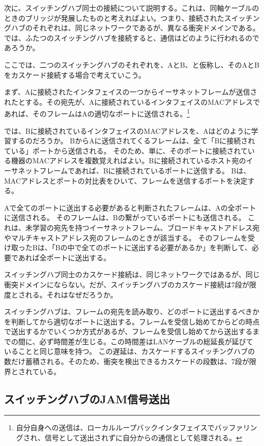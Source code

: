 次に、スイッチングハブ同士の接続について説明する。これは、同軸ケーブルのときのブリッジが発展したものと考えればよい。つまり、接続されたスイッチングハブのそれぞれは、同じネットワークであるが、異なる衝突ドメインである。では、ふたつのスイッチングハブを接続すると、通信はどのように行われるのであろうか。

ここでは、二つのスイッチングハブのそれぞれを、AとB、と仮称し、そのAとBをカスケード接続する場合で考えていこう。

まず、Aに接続されたインタフェイスの一つからイーサネットフレームが送信されたとする。その宛先が、Aに接続されているインタフェイスのMACアドレスであれば、そのフレームはAの適切なポートに送信される。\footnote{自分自身への送信は、ローカルループバックインタフェイスでバッファリングされ、信号として送出されずに自分からの通信として処理される。}

では、Bに接続されているインタフェイスのMACアドレスを、Aはどのように学習するのだろうか。
BからAに送信されてくるフレームは、全て「Bに接続されている」ポートから送信される。
そのため、単に、そのポートに接続されている機器のMACアドレスを複数覚えればよい。Bに接続されているホスト宛のイーサネットフレームであれば、Bに接続されているポートに送信する。
Bは、MACアドレスとポートの対比表をひいて、フレームを送信するポートを決定する。

Aで全てのポートに送出する必要があると判断されたフレームは、Aの全ポートに送信される。
そのフレームは、Bの繋がっているポートにも送信される。
これは、未学習の宛先を持つイーサネットフレーム、ブロードキャストアドレス宛やマルチキャストアドレス宛のフレームのときが該当する。
そのフレームを受け取ったBは、「Bの中で全てのポートに送出する必要があるか」を判断して、必要であれば全ポートに送出する。

スイッチングハブ同士のカスケード接続は、同じネットワークではあるが、同じ衝突ドメインにならない。だが、スイッチングハブのカスケード接続は7段が限度とされる。それはなぜだろうか。

スイッチングハブは、フレームの宛先を読み取り、どのポートに送出するべきかを判断してから適切なポートに送出する。フレームを受信し始めてからどの時点で送出するかでいくつか方式があるが、フレームを受信し始めてから送出するまでの間に、必ず時間差が生じる。この時間差はLANケーブルの総延長が延びていることと同じ意味を持つ。
この遅延は、カスケードするスイッチングハブの数だけ蓄積される。そのため、衝突を検出できるカスケードの段数は、7段が限界とされている。

\subsection{スイッチングハブのJAM信号送出}


